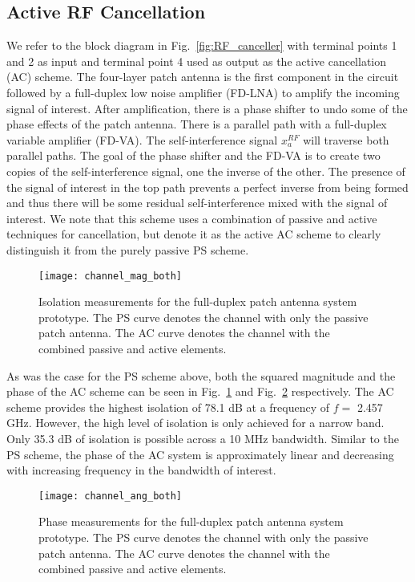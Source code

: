 \documentclass[12pt, journal,draftcls,letterpaper,onecolumn]{IEEEtran}
\begin{document}
\subsection{Active RF Cancellation}
We refer to the block diagram in Fig.~\ref{fig:RF_canceller} with terminal points 1 and 2 as input and terminal point 4 used as output as the active cancellation (AC) scheme.  The four-layer patch antenna is the first component in the circuit followed by a full-duplex low noise amplifier (FD-LNA) to amplify the incoming signal of interest.  After amplification, there is a phase shifter to undo some of the phase effects of the patch antenna.  There is a parallel path with a full-duplex variable amplifier (FD-VA).  The self-interference signal $x_a^{RF}$ will traverse both parallel paths.  The goal of the phase shifter and the FD-VA is to create two copies of the self-interference signal, one the inverse of the other.  The presence of the signal of interest in the top path prevents a perfect inverse from being formed and thus there will be some residual self-interference mixed with the signal of interest.  We note that this scheme uses a combination of passive and active techniques for cancellation, but denote it as the active AC scheme to clearly distinguish it from the purely passive PS scheme.  
\begin{figure}[htp]
\begin{center} 
  \texttt{[image: channel\_mag\_both]}
\caption[fig:chan_mag]{Isolation measurements for the full-duplex patch antenna system prototype.  The PS curve denotes the channel with only the passive patch antenna.  The AC curve denotes the channel with the combined passive and active elements.} 
  \label{fig:chan_mag} 
\end{center} 
\end{figure} 

As was the case for the PS scheme above, both the squared magnitude and the phase of the AC scheme can be seen in Fig.~\ref{fig:chan_mag} and Fig.~\ref{fig:chan_ang} respectively.  The AC scheme provides the highest isolation of 78.1 dB at a frequency of $f = $ 2.457 GHz.  However, the high level of isolation is only achieved for a narrow band.  Only 35.3 dB of isolation is possible across a 10 MHz bandwidth.  Similar to the PS scheme, the phase of the AC system is approximately linear and decreasing with increasing frequency in the bandwidth of interest.  
\begin{figure}[htp]
\begin{center} 
  \texttt{[image: channel\_ang\_both]}
\caption[fig:chan_ang]{Phase measurements for the full-duplex patch antenna system prototype.  The PS curve denotes the channel with only the passive patch antenna.  The AC curve denotes the channel with the combined passive and active elements.} 
  \label{fig:chan_ang}
\end{center} 
\end{figure}   
\end{document}

